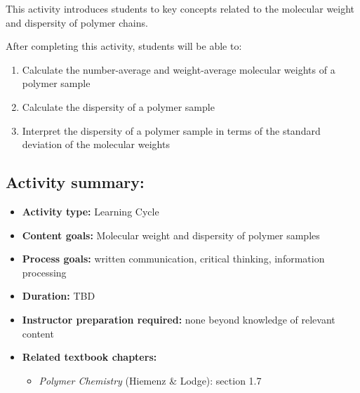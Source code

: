 %
%
%
%

\renewcommand{\figpath}{content/intro/M-and-D/figs}
\renewcommand{\labelbase}{M-and-D}

\begin{activity}

\begin{instructornotes}

	This activity introduces students to key concepts related to the molecular weight and dispersity of polymer chains.
	
	After completing this activity, students will be able to:
			\begin{enumerate}
				\item Calculate the number-average and weight-average molecular weights of a polymer sample
				\item Calculate the dispersity of a polymer sample
				\item Interpret the dispersity of a polymer sample in terms of the standard deviation of the molecular weights
			\end{enumerate}
			
	\subsection*{Activity summary:}
	\begin{itemize}
		\item \textbf{Activity type:} Learning Cycle
		\item \textbf{Content goals:} Molecular weight and dispersity of polymer samples
		\item \textbf{Process goals:} %
			written communication, critical thinking, information processing
		\item \textbf{Duration:} TBD
		\item \textbf{Instructor preparation required:} none beyond knowledge of relevant content
		\item \textbf{Related textbook chapters:}
			\begin{itemize}
				\item \emph{Polymer Chemistry} (Hiemenz \& Lodge): section 1.7
			\end{itemize}
	\end{itemize}


\end{instructornotes}
\end{activity}
